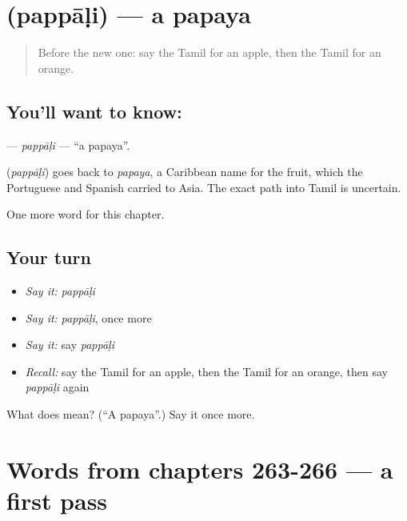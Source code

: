 \section[\texorpdfstring{\ta{பப்பாளி} (pappāḷi)}{பப்பாளி (pappāḷi)}]{ (pappāḷi) — a papaya}

\label{lesson:TA-C271-pappali}



\begin{quote}
Before the new one: say the Tamil for an apple, then the Tamil for an orange.
\end{quote}

\subsection*{You'll want to know: }
\textbf{} — \emph{pappāḷi} — \textquotedblleft{}a papaya\textquotedblright{}.

\begin{cousinweb}
\textbf{} (\emph{pappāḷi}) goes back to \emph{papaya}, a Caribbean name for the fruit, which the Portuguese and Spanish carried to Asia. The exact path into Tamil is uncertain.
\end{cousinweb}

\begin{grammarlens}[title={What you've built}]
One more word for this chapter.
\end{grammarlens}

\subsection*{Your turn}
\begin{itemize}
\raggedright
  \item \emph{Say it:} \emph{pappāḷi}
  \item \emph{Say it:} \emph{pappāḷi}, once more
  \item \emph{Say it:} say \emph{pappāḷi}
  \item \emph{Recall:} say the Tamil for an apple, then the Tamil for an orange, then say \emph{pappāḷi} again
\end{itemize}

\begin{tcolorbox}[breakable,colback=teal!4,colframe=teal!35!black,title={Before you move on}]
What does  mean? (\textquotedblleft{}A papaya\textquotedblright{}.) Say it once more.
\end{tcolorbox}
\section[(dialogue)]{Words from chapters 263-266 — a first pass}

